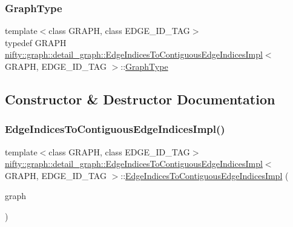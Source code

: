 \subsubsection{\texorpdfstring{Graph\+Type}{GraphType}}
{\footnotesize\ttfamily template$<$class G\+R\+A\+PH, class E\+D\+G\+E\+\_\+\+I\+D\+\_\+\+T\+AG$>$ \\
typedef G\+R\+A\+PH \hyperlink{classnifty_1_1graph_1_1detail__graph_1_1EdgeIndicesToContiguousEdgeIndicesImpl}{nifty\+::graph\+::detail\+\_\+graph\+::\+Edge\+Indices\+To\+Contiguous\+Edge\+Indices\+Impl}$<$ G\+R\+A\+PH, E\+D\+G\+E\+\_\+\+I\+D\+\_\+\+T\+AG $>$\+::\hyperlink{classnifty_1_1graph_1_1detail__graph_1_1EdgeIndicesToContiguousEdgeIndicesImpl_a9a93d5ced427774523bdbce7912d1788}{Graph\+Type}}



\subsection{Constructor \& Destructor Documentation}
\mbox{\label{classnifty_1_1graph_1_1detail__graph_1_1EdgeIndicesToContiguousEdgeIndicesImpl_a00a49b794117958e1b0303322c4965cb}} 
\subsubsection{\texorpdfstring{Edge\+Indices\+To\+Contiguous\+Edge\+Indices\+Impl()}{EdgeIndicesToContiguousEdgeIndicesImpl()}}
{\footnotesize\ttfamily template$<$class G\+R\+A\+PH, class E\+D\+G\+E\+\_\+\+I\+D\+\_\+\+T\+AG$>$ \\
\hyperlink{classnifty_1_1graph_1_1detail__graph_1_1EdgeIndicesToContiguousEdgeIndicesImpl}{nifty\+::graph\+::detail\+\_\+graph\+::\+Edge\+Indices\+To\+Contiguous\+Edge\+Indices\+Impl}$<$ G\+R\+A\+PH, E\+D\+G\+E\+\_\+\+I\+D\+\_\+\+T\+AG $>$\+::\hyperlink{classnifty_1_1graph_1_1detail__graph_1_1EdgeIndicesToContiguousEdgeIndicesImpl}{Edge\+Indices\+To\+Contiguous\+Edge\+Indices\+Impl} (\begin{DoxyParamCaption}\item[{const \hyperlink{classnifty_1_1graph_1_1detail__graph_1_1EdgeIndicesToContiguousEdgeIndicesImpl_a9a93d5ced427774523bdbce7912d1788}{Graph\+Type} \&}]{graph }\end{DoxyParamCaption})\hspace{0.3cm}{\ttfamily [inline]}}




